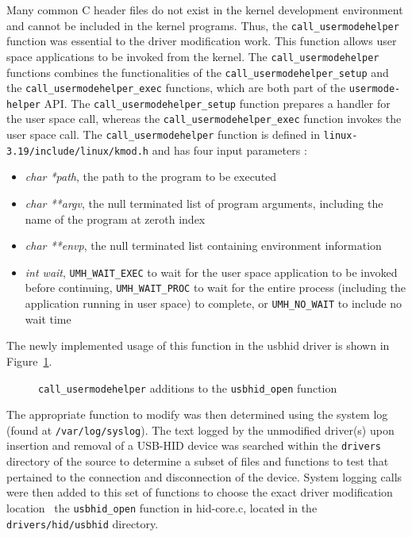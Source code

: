 \documentclass[pagenumbers]{ieee}
\begin{document}
Many common C header files do not exist in the kernel development environment and cannot be included in the kernel programs. Thus, the \texttt{call\_usermodehelper} function was essential to the driver modification work. This function allows user space applications to be invoked from the kernel. The \texttt{call\_usermodehelper} functions combines the functionalities of the \texttt{call\_usermodehelper\_setup} and the \texttt{call\_usermodehelper\_exec} functions, which are both part of the \texttt{usermode-helper} API. The \texttt{call\_usermodehelper\_setup} function prepares a handler for the user space call, whereas the \texttt{call\_usermodehelper\_exec} function invokes the user space call. The \texttt{call\_usermodehelper} function is defined in \texttt{linux-3.19/include/linux/kmod.h} and has four input parameters \cite{ibm}:
\begin{itemize}
\item \textit{char *path}, the path to the program to be executed
\item \textit{char **argv}, the null terminated list of program arguments, including the name of the program at zeroth index
\item \textit{char **envp}, the null terminated list containing environment information 
\item \textit{int wait}, \texttt{UMH\_WAIT\_EXEC} to wait for the user space application to be invoked before continuing, \texttt{UMH\_WAIT\_PROC} to wait for the entire process (including the application running in user space) to complete, or \texttt{UMH\_NO\_WAIT} to include no wait time
\end{itemize}

The newly implemented usage of this function in the usbhid driver is shown in Figure~\ref{fig:usermodehelper_code}.

\begin{figure}[H]
   \caption{\texttt{call\_usermodehelper} additions to the \texttt{usbhid\_open} function}
   \label{fig:usermodehelper_code}
\end{figure}

The appropriate function to modify was then determined using the system log (found at \texttt{/var/log/syslog}). The text logged by the unmodified driver(s) upon insertion and removal of a USB-HID device was searched within the \texttt{drivers} directory of the source to determine a subset of files and functions to test that pertained to the connection and disconnection of the device. System logging calls were then added to this set of functions to choose the exact driver modification location \textemdash \ the \texttt{usbhid\_open} function in hid-core.c, located in the \texttt{drivers/hid/usbhid} directory.
\end{document}

